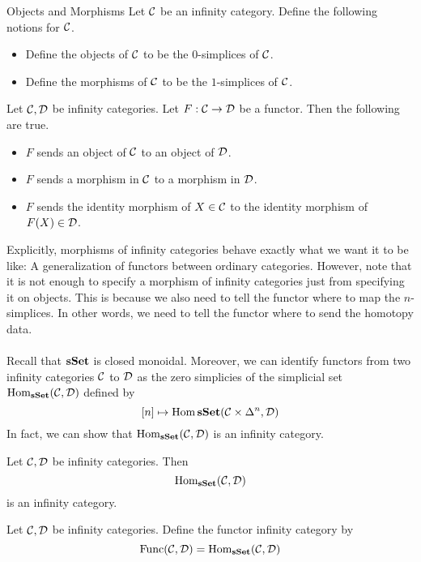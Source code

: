 \documentclass[a4paper]{article}
\begin{document}
\begin{defn}{Objects and Morphisms}{} Let $\mathcal{C}$ be an infinity category. Define the following notions for $\mathcal{C}$. 
\begin{itemize}
\item Define the objects of $\mathcal{C}$ to be the $0$-simplices of $\mathcal{C}$. 
\item Define the morphisms of $\mathcal{C}$ to be the $1$-simplices of $\mathcal{C}$. 
\end{itemize}
\end{defn}

\begin{lmm}{}{} Let $\mathcal{C},\mathcal{D}$ be infinity categories. Let $F:\mathcal{C}\to\mathcal{D}$ be a functor. Then the following are true. 
\begin{itemize}
\item $F$ sends an object of $\mathcal{C}$ to an object of $\mathcal{D}$. 
\item $F$ sends a morphism in $\mathcal{C}$ to a morphism in $\mathcal{D}$. 
\item $F$ sends the identity morphism of $X\in\mathcal{C}$ to the identity morphism of $F(X)\in\mathcal{D}$. 
\end{itemize}
\end{lmm}

Explicitly, morphisms of infinity categories behave exactly what we want it to be like: A generalization of functors between ordinary categories. However, note that it is not enough to specify a morphism of infinity categories just from specifying it on objects. This is because we also need to tell the functor where to map the $n$-simplices. In other words, we need to tell the functor where to send the homotopy data. \\~\\

Recall that $\bold{sSet}$ is closed monoidal. Moreover, we can identify functors from two infinity categories $\mathcal{C}$ to $\mathcal{D}$ as the zero simplicies of the simplicial set $\operatorname{Hom}_\bold{sSet}(\mathcal{C},\mathcal{D})$ defined by $$[n]\mapsto\operatorname{Hom}\bold{sSet}(\mathcal{C}\times\Delta^n,\mathcal{D})$$ In fact, we can show that $\operatorname{Hom}_\bold{sSet}(\mathcal{C},\mathcal{D})$ is an infinity category. 

\begin{prp}{}{} Let $\mathcal{C},\mathcal{D}$ be infinity categories. Then $$\text{Hom}_\bold{sSet}(\mathcal{C},\mathcal{D})$$ is an infinity category. 
\end{prp}

\begin{defn}{}{} Let $\mathcal{C},\mathcal{D}$ be infinity categories. Define the functor infinity category by $$\text{Func}(\mathcal{C},\mathcal{D})=\operatorname{Hom}_\bold{sSet}(\mathcal{C},\mathcal{D})$$
\end{defn}
\end{document}
